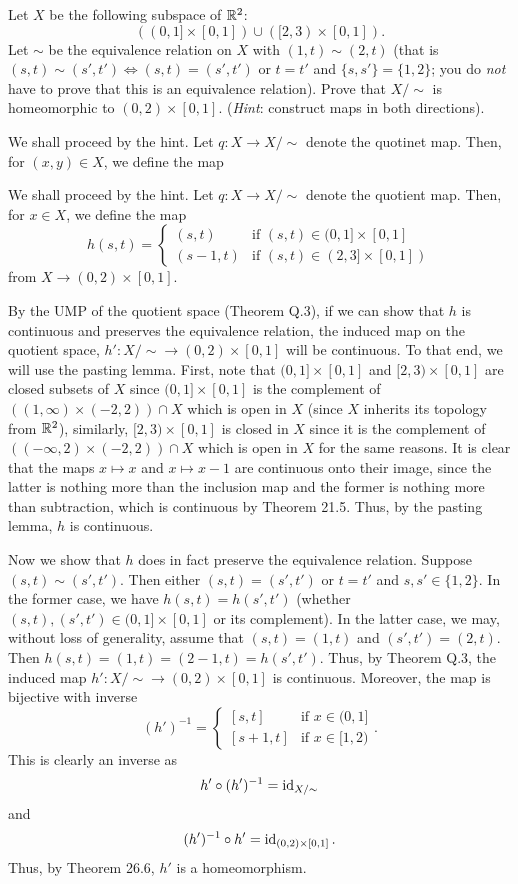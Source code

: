 \begin{problem}
  Let $X$ be the following subspace of $\mathbb{R}^2$:
  \[
    ((0,1]\times[0,1])\cup([2,3)\times[0,1]).
  \]
  Let $\sim$ be the equivalence relation on $X$ with $(1,t)\sim(2,t)$ (that
  is $(s,t)\sim(s',t')\iff(s,t)=(s',t')$ or $t=t'$ and $\{s,s'\}=\{1,2\}$;
  you do \emph{not} have to prove that this is an equivalence
  relation). Prove that $X/{\sim}$ is homeomorphic to
  $(0,2)\times[0,1]$. (\emph{Hint}: construct maps in both directions).
\end{problem}
\begin{solution}
  We shall proceed by the hint. Let $q\colon X\to X/{\sim}$ denote the
  quotinet map. Then, for $(x,y)\in X$, we define the map

  We shall proceed by the hint. Let $q\colon X\to X/{\sim}$ denote the
  quotient map. Then, for $x\in X$, we define the map
  \[
    h(s,t)=
    \begin{cases}
      (s,t)&\text{if $(s,t)\in(0,1]\times[0,1]$}\\
      (s-1,t)&\text{if $(s,t)\in(2,3]\times[0,1])$}
    \end{cases}
  \]
  from $X\to(0,2)\times[0,1]$.

  By the UMP of the quotient space (Theorem Q.3), if we can show that $h$
  is continuous and preserves the equivalence relation, the induced map on
  the quotient space, $h'\colon X/{\sim}\to (0,2)\times[0,1]$ will be
  continuous. To that end, we will use the pasting lemma. First, note that
  $(0,1]\times[0,1]$ and $[2,3)\times[0,1]$ are closed subsets of $X$ since
  $(0,1]\times[0,1]$ is the complement of $((1,\infty)\times (-2,2))\cap X$
  which is open in $X$ (since $X$ inherits its topology from $\mathbb{R}^2$),
  similarly, $[2,3)\times[0,1]$ is closed in $X$ since it is the complement
  of $((-\infty,2)\times(-2,2))\cap X$ which is open in $X$ for the same
  reasons. It is clear that the maps $x\mapsto x$ and $x\mapsto x-1$ are
  continuous onto their image, since the latter is nothing more than the
  inclusion map and the former is nothing more than subtraction, which is
  continuous by Theorem 21.5. Thus, by the pasting lemma, $h$ is
  continuous.

  Now we show that $h$ does in fact preserve the equivalence
  relation. Suppose $(s,t)\sim(s',t')$. Then either $(s,t)=(s',t')$ or
  $t=t'$ and $s,s'\in\{1,2\}$. In the former case, we have
  $h(s,t)=h(s',t')$ (whether $(s,t),(s',t')\in(0,1]\times[0,1]$ or its
  complement). In the latter case, we may, without loss of generality,
  assume that $(s,t)=(1,t)$ and $(s',t')=(2,t)$. Then
  $h(s,t)=(1,t)=(2-1,t)=h(s',t')$. Thus, by Theorem Q.3, the induced map
  $h'\colon X/{\sim}\to(0,2)\times[0,1]$ is continuous. Moreover, the map
  is bijective with inverse
  \[
    (h')^{-1}=
    \begin{cases}
      [s,t]&\text{if $x\in (0,1]$}\\
      [s+1,t]&\text{if $x\in [1,2)$}
    \end{cases}.
  \]
  This is clearly an inverse as
  \[
    h'\circ (h')^{-1}=\operatorname{id}_{X/{\sim}}
  \]
  and
  \[
    (h')^{-1}\circ h'=\operatorname{id}_{(0,2)\times[0,1]}.
  \]
  Thus, by Theorem 26.6, $h'$ is a homeomorphism.
\end{solution}

